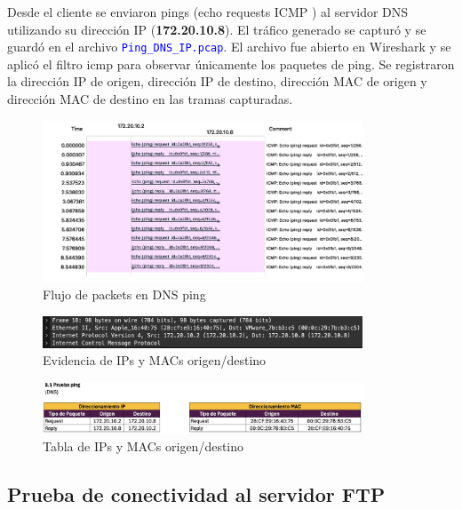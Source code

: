 \documentclass[10pt]{article}
\begin{document}
Desde el cliente se enviaron pings (echo requests ICMP ) al servidor DNS utilizando su dirección IP (\textbf{172.20.10.8}). El tráfico generado se capturó y se guardó en el archivo \textcolor{blue}{\texttt{Ping\_DNS\_IP.pcap}}. El archivo fue abierto en Wireshark y se aplicó el filtro icmp para observar únicamente los paquetes de ping. Se registraron la dirección IP de origen, dirección IP de destino, dirección MAC de origen y dirección MAC de destino en las tramas capturadas.

\begin{figure}[H]
    \centering
    \includegraphics[width=0.85\textwidth]{lab-02-screenshots/8.1-DNS-flow}
    \caption{Flujo de packets en DNS ping}
\end{figure}


\begin{figure}[H]
    \centering
    \includegraphics[width=0.85\textwidth]{lab-02-screenshots/8.1-DNS-data}
    \caption{Evidencia de IPs y MACs origen/destino}
\end{figure}

\begin{figure}[H]
    \centering
    \includegraphics[width=0.85\textwidth]{lab-02-screenshots/8.1-DNS-ping-table}
    \caption{Tabla de IPs y MACs origen/destino}
\end{figure}


\subsection{Prueba de conectividad al servidor FTP}
\end{document}
